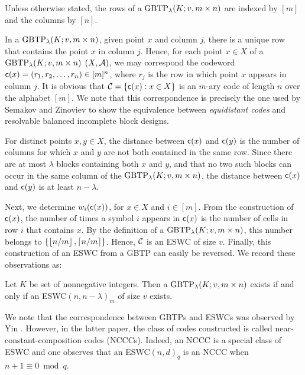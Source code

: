 \documentclass[draft, 11pt]{article}
\begin{document}
 Unless otherwise stated, the rows of a $\textrm{GBTP}_\lambda(K;v,m\times n)$ are
 indexed by $[m]$ and the columns by $\left[ n\right]$.

 In a ${\rm GBTP}_\lambda(K;v,m\times n)$, given point $x$ and
 column $j$, there is a unique row that contains the point $x$ in
 column $j$. Hence, for each point $x\in X$ of a ${\rm
 GBTP}_\lambda(K;v,m\times n)$ $(X,\mathcal A)$, we may correspond the
 codeword ${\sf c}(x)=\left(r_1,r_2,\ldots,r_n\right)\in [m]^n$, where
 $r_j$ is the row in which point $x$ appears in column $j$. It is
 obvious that $\mathcal C=\{{\sf c}(x): x\in X\}$ is an $m$-ary code of length
 $n$ over the alphabet $[m]$. We note that this correspondence is
 precisely the one used by Semakov and Zinoviev
 \cite{SemakovZinoviev:1968} to show the equivalence between {\em
 equidistant codes} and resolvable balanced incomplete block designs.

 For distinct points $x,y\in X$, the distance between ${\sf c}(x)$ and
 ${\sf c}(y)$ is the number of columns for which $x$ and $y$ are not both
 contained in the same row. Since there are at most $\lambda$ blocks
 containing both $x$ and $y$, and that no two such blocks can occur
 in the same column of the ${\rm GBTP}_\lambda(K;v,m\times n)$, the
 distance between ${\sf c}(x)$ and ${\sf c}(y)$ is at least $n- \lambda$.


Next, we determine $w_i({\sf c}(x))$, for $x\in X$ and $i\in [m]$. From
the construction of ${\sf c}(x)$, the number of times a symbol $i$
appears in ${\sf c}(x)$ is the number of cells in row $i$ that contains
$x$. By the definition of a ${\rm GBTP}_\lambda(K;v,m\times n)$,
this number belongs to $\left\{\left\lfloor{n/m}\right\rfloor,\left\lceil{n/m}\right\rceil\right\}$.
Hence, $\mathcal C$ is an ESWC of size $v$.
Finally, this construction of an ESWC from a
GBTP can easily be reversed. 
We record these observations as:

 \begin{theorem}
 \label{thm:esw-gbtp} Let $K$ be set of nonnegative integers.
  Then a ${\rm GBTP}_\lambda(K;v,m\times
 n)$ exists if and only if an ESWC$(n,n-\lambda)_m$ %
 of size $v$ exists.
 \end{theorem}
 
 We note that the correspondence between GBTPs and ESWCs was observed by Yin \etal{} \cite[Theorem 2.2]{Yinetal:2008}.
 However, in the latter paper, the class of codes constructed is called near-constant-composition codes (NCCCs). 
 Indeed, an NCCC is a special class of ESWC and one observes that  an ESWC$(n,d)_q$ is an NCCC when $n+1\equiv 0\bmod q$.
\end{document}
